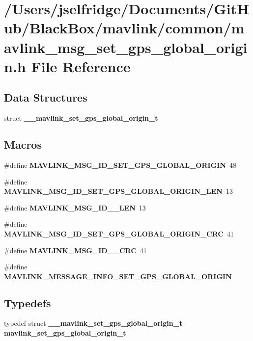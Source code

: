 \section{/\+Users/jselfridge/\+Documents/\+Git\+Hub/\+Black\+Box/mavlink/common/mavlink\+\_\+msg\+\_\+set\+\_\+gps\+\_\+global\+\_\+origin.h File Reference}
\label{mavlink__msg__set__gps__global__origin_8h}
\subsection*{Data Structures}
\begin{DoxyCompactItemize}
\item 
struct \textbf{ \+\_\+\+\_\+mavlink\+\_\+set\+\_\+gps\+\_\+global\+\_\+origin\+\_\+t}
\end{DoxyCompactItemize}
\subsection*{Macros}
\begin{DoxyCompactItemize}
\item 
\#define \textbf{ M\+A\+V\+L\+I\+N\+K\+\_\+\+M\+S\+G\+\_\+\+I\+D\+\_\+\+S\+E\+T\+\_\+\+G\+P\+S\+\_\+\+G\+L\+O\+B\+A\+L\+\_\+\+O\+R\+I\+G\+IN}~48
\item 
\#define \textbf{ M\+A\+V\+L\+I\+N\+K\+\_\+\+M\+S\+G\+\_\+\+I\+D\+\_\+\+S\+E\+T\+\_\+\+G\+P\+S\+\_\+\+G\+L\+O\+B\+A\+L\+\_\+\+O\+R\+I\+G\+I\+N\+\_\+\+L\+EN}~13
\item 
\#define \textbf{ M\+A\+V\+L\+I\+N\+K\+\_\+\+M\+S\+G\+\_\+\+I\+D\+\_\+\_\+\+L\+EN}~13
\item 
\#define \textbf{ M\+A\+V\+L\+I\+N\+K\+\_\+\+M\+S\+G\+\_\+\+I\+D\+\_\+\+S\+E\+T\+\_\+\+G\+P\+S\+\_\+\+G\+L\+O\+B\+A\+L\+\_\+\+O\+R\+I\+G\+I\+N\+\_\+\+C\+RC}~41
\item 
\#define \textbf{ M\+A\+V\+L\+I\+N\+K\+\_\+\+M\+S\+G\+\_\+\+I\+D\+\_\+\_\+\+C\+RC}~41
\item 
\#define \textbf{ M\+A\+V\+L\+I\+N\+K\+\_\+\+M\+E\+S\+S\+A\+G\+E\+\_\+\+I\+N\+F\+O\+\_\+\+S\+E\+T\+\_\+\+G\+P\+S\+\_\+\+G\+L\+O\+B\+A\+L\+\_\+\+O\+R\+I\+G\+IN}
\end{DoxyCompactItemize}
\subsection*{Typedefs}
\begin{DoxyCompactItemize}
\item 
typedef struct \textbf{ \+\_\+\+\_\+mavlink\+\_\+set\+\_\+gps\+\_\+global\+\_\+origin\+\_\+t} \textbf{ mavlink\+\_\+set\+\_\+gps\+\_\+global\+\_\+origin\+\_\+t}
\end{DoxyCompactItemize}


